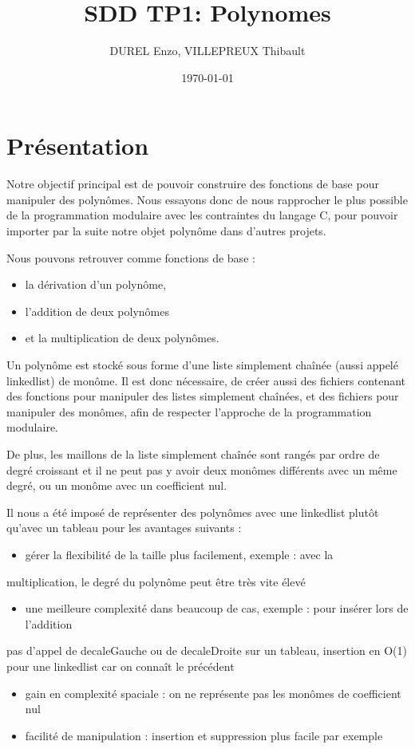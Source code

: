 \documentclass[11pt]{article}
\author{DUREL Enzo, VILLEPREUX Thibault}
\date{\today}
\title{SDD TP1: Polynomes}
\begin{document}
\maketitle
\tableofcontents

\thispagestyle{fancy}

\newpage

\section{Présentation}
\label{sec:org54afc19}
Notre objectif principal est de pouvoir construire des fonctions de base pour manipuler
des polynômes. Nous essayons donc de nous rapprocher le plus possible de la
programmation modulaire avec les contraintes du langage C, pour pouvoir importer
par la suite notre objet polynôme dans d'autres projets.

Nous pouvons retrouver comme fonctions de base :
\begin{itemize}
\item la dérivation d'un polynôme,
\item l'addition de deux polynômes
\item et la multiplication de deux polynômes.
\end{itemize}

Un polynôme est stocké sous forme d'une liste simplement chaînée (aussi appelé linkedlist) de monôme. Il
est donc nécessaire, de créer aussi des fichiers contenant des fonctions pour
manipuler des listes simplement chaînées, et des fichiers pour manipuler des
monômes, afin de respecter l'approche de la programmation modulaire.

De plus, les maillons de la liste simplement chaînée sont rangés par ordre de
degré croissant et il ne peut pas y avoir deux monômes différents avec un même
degré, ou un monôme avec un coefficient nul.

Il nous a été imposé de représenter des polynômes avec une
linkedlist plutôt qu'avec un tableau pour les avantages suivants :
\begin{itemize}
\item gérer la flexibilité de la taille plus facilement, exemple : avec la
\end{itemize}
multiplication, le degré du polynôme peut être très vite élevé
\begin{itemize}
\item une meilleure complexité dans beaucoup de cas, exemple : pour insérer lors de l'addition
\end{itemize}
pas d'appel de decaleGauche ou de  decaleDroite sur un tableau, insertion en
O(1) pour une linkedlist car on connaît le précédent
\begin{itemize}
\item gain en complexité spaciale : on ne représente pas les monômes de coefficient nul
\item facilité de manipulation : insertion et suppression plus facile par exemple
\end{itemize}
\end{document}
